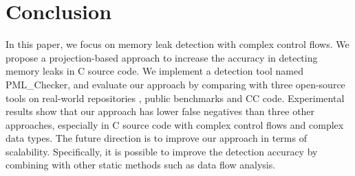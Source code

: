\section{Conclusion}\label{sec:conclusion}

In this paper, we focus on memory leak detection with complex control flows. We propose a projection-based approach to increase the accuracy in detecting memory leaks in C source code. We implement a detection tool named PML\_Checker, and evaluate our approach by comparing with three open-source tools %
on real-world repositories%
, public benchmarks and CC code. Experimental results show that our approach has lower false negatives than three other approaches, especially in C source code with complex control flows and complex data types. The future direction is to improve our approach in terms of scalability. Specifically, it is possible to improve the detection accuracy by combining with other static methods such as data flow analysis.
